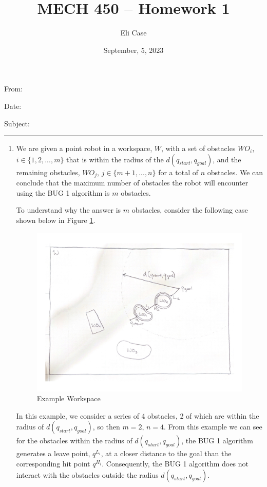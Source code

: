 \documentclass[11pt]{article}
\author{Eli Case}
\title{MECH 450 -- Homework 1}
\date{September, 5, 2023}
\begin{document}
\flushleft
\thispagestyle{plain}

From: \@author

Date: \@date

Subject: \@title

\makeatother
\medskip
\hrule
\medskip

\begin{enumerate}[leftmargin=0.3in]

   \item %
   \begin{enumerate}
    We are given a point robot in a workspace, $W$, with a set of obstacles $WO_i$, $i \in \{1, 2, ..., m\}$ that is within the radius of the $d(q_{start}, q_{goal})$, and the remaining obstacles, $WO_j$, $j \in \{m +1,..., n\}$ for a total of $n$ obstacles. We can conclude that the maximum number of obstacles the robot will encounter using the BUG 1 algorithm is $m$ obstacles. \break 

   To understand why the answer is $m$ obstacles, consider the following case shown below in Figure \ref{fig:1}. \break 

   \begin{figure}[H]
      \centering
      \includegraphics[width=11cm]{figures/problem1.png}
      \caption{Example Workspace}
      \label{fig:1}
   \end{figure}
    
   In this example, we consider a series of 4 obstacles, 2 of which are within the radius of $d(q_{start}, q_{goal})$, so then $m = 2$, $n = 4$. From this example we can see for the obstacles within the radius of $d(q_{start}, q_{goal})$, the BUG 1 algorithm generates a leave point, $q^{L_i}$, at a closer distance to the goal than the corresponding hit point $q^{H_i}$. Consequently, the BUG 1 algorithm does not interact with the obstacles outside the radius $d(q_{start}, q_{goal})$. \break


\end{enumerate}
\end{enumerate}
\end{document}
